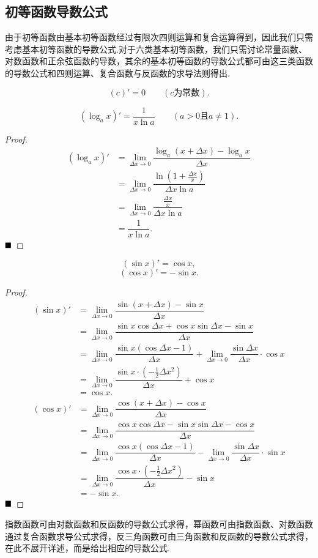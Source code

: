 \subsection{初等函数导数公式}
由于初等函数由基本初等函数经过有限次四则运算和复合运算得到，因此我们只需考虑基本初等函数的导数公式.对于六类基本初等函数，我们只需讨论常量函数、对数函数和正余弦函数的导数，其余的基本初等函数的导数公式都可由这三类函数的导数公式和四则运算、复合函数与反函数的求导法则得出.
\begin{proposition}[常量函数]
	$$(c)'=0\qquad(c\text{为常数}).$$
\end{proposition}
\begin{proposition}[对数函数]
	$$(\log_ax)'=\frac{1}{x\ln a}\qquad(a>0\text{且}a\neq 1).$$
\end{proposition}
\begin{proof}
	\begin{align*}
		(\log_ax)'
		&=\lim\limits_{\Delta x\to 0}\dfrac{\log_a(x+\Delta x)-\log_ax}{\Delta x}\\
		&=\lim\limits_{\Delta x\to 0}\dfrac{\ln(1+\frac{\Delta x}{x})}{\Delta x\ln a}\\
		&=\lim\limits_{\Delta x\to 0}\dfrac{\frac{\Delta x}{x}}{\Delta x\ln a}\\
		&=\dfrac{1}{x\ln a}.
	\end{align*}
	$\hfill\blacksquare$
\end{proof}
\begin{proposition}[正余弦函数]
	$$(\sin x)'=\cos x,$$
	$$(\cos x)'=-\sin x.$$
\end{proposition}
\begin{proof}
	\begin{align*}
		(\sin x)'
		&=\lim\limits_{\Delta x\to 0}\dfrac{\sin(x+\Delta x)-\sin x}{\Delta x}\\
		&=\lim\limits_{\Delta x\to 0}\dfrac{\sin x\cos\Delta x+\cos x\sin\Delta x-\sin x}{\Delta x}\\
		&=\lim\limits_{\Delta x\to 0}\dfrac{\sin x(\cos\Delta x-1)}{\Delta x}+\lim\limits_{\Delta x\to 0}\dfrac{\sin\Delta x}{\Delta x}\cdot\cos x\\
		&=\lim\limits_{\Delta x\to 0}\dfrac{\sin x\cdot(-\frac{1}{2}\Delta x^2)}{\Delta x}+\cos x\\
		&=\cos x.
	\end{align*}
	\begin{align*}
		(\cos x)'
		&=\lim\limits_{\Delta x\to 0}\dfrac{\cos(x+\Delta x)-\cos x}{\Delta x}\\
		&=\lim\limits_{\Delta x\to 0}\dfrac{\cos x\cos\Delta x-\sin x\sin\Delta x-\cos x}{\Delta x}\\
		&=\lim\limits_{\Delta x\to 0}\dfrac{\cos x(\cos\Delta x-1)}{\Delta x}-\lim\limits_{\Delta x\to 0}\dfrac{\sin\Delta x}{\Delta x}\cdot\sin x\\
		&=\lim\limits_{\Delta x\to 0}\dfrac{\cos x\cdot(-\frac{1}{2}\Delta x^2)}{\Delta x}-\sin x\\
		&=-\sin x.
	\end{align*}
	$\hfill\blacksquare$
\end{proof}
指数函数可由对数函数和反函数的导数公式求得，幂函数可由指数函数、对数函数通过复合函数求导公式求得，反三角函数可由三角函数和反函数的导数公式求得，在此不展开详述，而是给出相应的导数公式.

